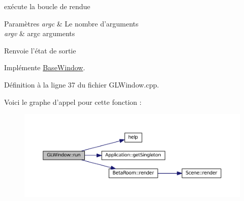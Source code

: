 exécute la boucle de rendue 


\begin{DoxyParams}{Paramètres}
{\em argc} & Le nombre d'arguments \\
\hline
{\em argv} & argc arguments \\
\hline
\end{DoxyParams}
\begin{DoxyReturn}{Renvoie}
l'état de sortie 
\end{DoxyReturn}


Implémente \hyperlink{classBaseWindow_a2faf52e77b0c61225d81be8b25afd661}{Base\+Window}.



Définition à la ligne 37 du fichier G\+L\+Window.\+cpp.



Voici le graphe d'appel pour cette fonction \+:
\nopagebreak
\begin{figure}[H]
\begin{center}
\leavevmode
\includegraphics[width=350pt]{classGLWindow_a297b34b4bbf69b29516e279839262623_cgraph}
\end{center}
\end{figure}


